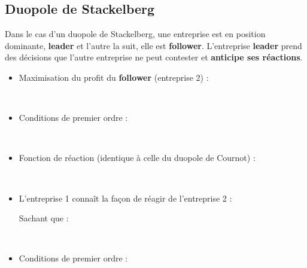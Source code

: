 \subsection{Duopole de Stackelberg}
Dans le cas d'un duopole de Stackelberg, une entreprise est en position dominante, \textbf{leader} et l'autre la suit, elle est \textbf{follower}. L'entreprise \textbf{leader} prend des décisions que l'autre entreprise ne peut contester et \textbf{anticipe ses réactions}. \newline
\begin{itemize}
    \item Maximisation du profit du \textbf{follower} (entreprise 2) : \newline
    \textcolor{White}{.}
    \begin{center}
        \Large{}
    \end{center}    \textcolor{White}{.}
    \item Conditions de premier ordre : \newline
    \textcolor{White}{.}
    \begin{center}
        \Large{}
    \end{center}
    \textcolor{White}{.}
    \item Fonction de réaction (identique à celle du duopole de Cournot) : \newline
    \textcolor{White}{.}
    \begin{center}
        \Large{}
    \end{center}
    \textcolor{White}{.}
    \item L'entreprise 1 connaît la façon de réagir de l'entreprise 2 : \newline
    \textcolor{White}{.}
    \begin{center}
        \Large{}
    \end{center}
    Sachant que :
    \begin{center}
        \Large{}
    \end{center}
    \textcolor{White}{.}
    \item Conditions de premier ordre : \newline
    \textcolor{White}{.}
    \begin{center}
        \Large{}
    \end{center}
\end{itemize}
